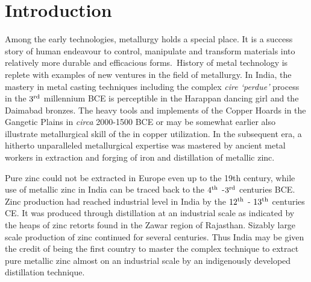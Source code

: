 \chapter{Introduction}\label{chapter1}



\vspace{-.3cm}

Among the early technologies, metallurgy holds a special place. It is a success story of human endeavour to control, manipulate and transform materials into relatively more durable and efficacious forms.~History of metal technology is replete with examples of new ventures in the field of metallurgy. In India, the mastery in metal casting techniques including the complex \textit{cire `perdue'} process in the $3^{\rm rd}$ millennium BCE is perceptible in the Harappan dancing girl and the Daimabad bronzes. The heavy tools and implements of the Copper Hoards in the Gangetic Plains in \textit{circa} 2000-1500 BCE or may be somewhat earlier also illustrate metallurgical skill of the in copper utilization. In the subsequent era, a hitherto unparalleled metallurgical expertise was mastered by ancient metal workers in extraction and forging of iron and distillation of metallic zinc. 

Pure zinc could not be extracted in Europe even up to the 19th century, while use of metallic zinc in India can be traced back to the $4^{\rm th}$ -$3^{\rm rd}$ centuries BCE. Zinc production had reached industrial level in India by the $12^{\rm th}$ - $13^{\rm th}$ centuries CE. It was produced through distillation at an industrial scale as indicated by the heaps of zinc retorts found in the Zawar region of Rajasthan. Sizably large scale production of zinc continued for several centuries. Thus India may be given the credit of being the first country to master the complex technique to extract pure metallic zinc almost on an industrial scale by an indigenously developed distillation technique.

